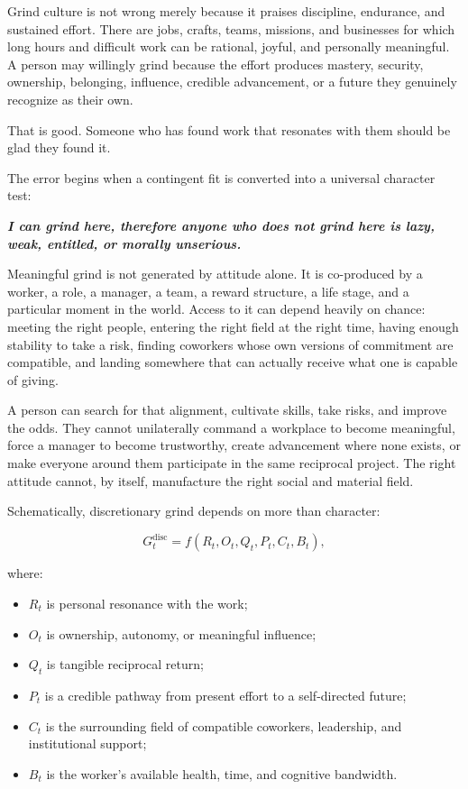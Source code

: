 \documentclass[11pt,oneside]{article}
\providecommand{\tightlist}{%
  \setlength{\itemsep}{0.22em}\setlength{\parskip}{0pt}}
\renewenvironment{quote}
  {\begin{tcolorbox}[
      enhanced,
      breakable,
      colback=ManifestLight,
      colframe=ManifestRule,
      boxrule=0pt,
      leftrule=3pt,
      arc=0pt,
      outer arc=0pt,
      left=10pt,right=10pt,top=8pt,bottom=8pt,
      before skip=0.8em,after skip=0.8em
    ]\itshape}
  {\end{tcolorbox}}
\begin{document}
Grind culture is not wrong merely because it praises discipline,
endurance, and sustained effort. There are jobs, crafts, teams, missions,
and businesses for which long hours and difficult work can be rational,
joyful, and personally meaningful. A person may willingly grind because
the effort produces mastery, security, ownership, belonging, influence,
credible advancement, or a future they genuinely recognize as their
own.

That is good. Someone who has found work that resonates with them should
be glad they found it.

The error begins when a contingent fit is converted into a universal
character test:

\begin{quote}
\textbf{I can grind here, therefore anyone who does not grind here is
lazy, weak, entitled, or morally unserious.}
\end{quote}

Meaningful grind is not generated by attitude alone. It is co-produced
by a worker, a role, a manager, a team, a reward structure, a life stage,
and a particular moment in the world. Access to it can depend heavily on
chance: meeting the right people, entering the right field at the right
time, having enough stability to take a risk, finding coworkers whose
own versions of commitment are compatible, and landing somewhere that
can actually receive what one is capable of giving.

A person can search for that alignment, cultivate skills, take risks,
and improve the odds. They cannot unilaterally command a workplace to
become meaningful, force a manager to become trustworthy, create
advancement where none exists, or make everyone around them participate
in the same reciprocal project. The right attitude cannot, by itself,
manufacture the right social and material field.

Schematically, discretionary grind depends on more than character:

\[
G_t^{\mathrm{disc}}
=
f(R_t,O_t,Q_t,P_t,C_t,B_t),
\]

where:

\begin{itemize}
\tightlist
\item
  $R_t$ is personal resonance with the work;
\item
  $O_t$ is ownership, autonomy, or meaningful influence;
\item
  $Q_t$ is tangible reciprocal return;
\item
  $P_t$ is a credible pathway from present effort to a self-directed
  future;
\item
  $C_t$ is the surrounding field of compatible coworkers, leadership,
  and institutional support;
\item
  $B_t$ is the worker's available health, time, and cognitive bandwidth.
\end{itemize}
\end{document}
